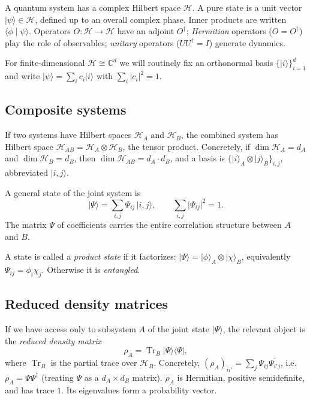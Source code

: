 \documentclass[11pt,a4paper]{article}
\theoremstyle{definition}
\theoremstyle{plain}
\theoremstyle{remark}
\newcommand{\ket}[1]{\lvert #1 \rangle}
\newcommand{\bra}[1]{\langle #1 \rvert}
\newcommand{\braket}[2]{\langle #1 \mid #2 \rangle}
\newcommand{\abs}[1]{\lvert #1 \rvert}
\newcommand{\Tr}{\operatorname{Tr}}
\newcommand{\Hilb}{\mathcal{H}}
\newcommand{\complex}{\mathbb{C}}
\begin{document}
A quantum system has a complex Hilbert space $\Hilb$.  A pure state is
a unit vector $\ket{\psi} \in \Hilb$, defined up to an overall complex
phase.  Inner products are written $\braket{\phi}{\psi}$.  Operators
$O : \Hilb \to \Hilb$ have an adjoint $O^\dagger$; \emph{Hermitian}
operators ($O = O^\dagger$) play the role of observables; \emph{unitary}
operators ($U U^\dagger = I$) generate dynamics.

For finite-dimensional $\Hilb \cong \complex^d$ we will routinely fix
an orthonormal basis $\{\ket{i}\}_{i=1}^d$ and write
$\ket{\psi} = \sum_i c_i \ket{i}$ with $\sum_i \abs{c_i}^2 = 1$.

\subsection{Composite systems}

If two systems have Hilbert spaces $\Hilb_A$ and $\Hilb_B$, the
combined system has Hilbert space
$\Hilb_{AB} = \Hilb_A \otimes \Hilb_B$, the tensor product.
Concretely, if $\dim \Hilb_A = d_A$ and $\dim \Hilb_B = d_B$, then
$\dim \Hilb_{AB} = d_A \cdot d_B$, and a basis is
$\{\ket{i}_A \otimes \ket{j}_B\}_{i,j}$, abbreviated $\ket{i,j}$.

A general state of the joint system is
\begin{equation}\label{eq:joint}
  \ket{\Psi} = \sum_{i,j} \Psi_{ij} \, \ket{i,j},
  \qquad \sum_{i,j}\abs{\Psi_{ij}}^2 = 1.
\end{equation}
The matrix $\Psi$ of coefficients carries the entire correlation
structure between $A$ and $B$.

A state is called a \emph{product state} if it factorizes:
$\ket{\Psi} = \ket{\phi}_A \otimes \ket{\chi}_B$, equivalently
$\Psi_{ij} = \phi_i \chi_j$.  Otherwise it is \emph{entangled}.

\subsection{Reduced density matrices}

If we have access only to subsystem $A$ of the joint state $\ket{\Psi}$,
the relevant object is the \emph{reduced density matrix}
\begin{equation}\label{eq:rho}
  \rho_A = \Tr_B \ket{\Psi}\bra{\Psi},
\end{equation}
where $\Tr_B$ is the partial trace over $\Hilb_B$.  Concretely,
$(\rho_A)_{ii'} = \sum_j \Psi_{ij} \overline{\Psi_{i'j}}$, i.e.\
$\rho_A = \Psi \Psi^\dagger$ (treating $\Psi$ as a $d_A \times d_B$
matrix).  $\rho_A$ is Hermitian, positive semidefinite, and has trace
$1$.  Its eigenvalues form a probability vector.
\end{document}
